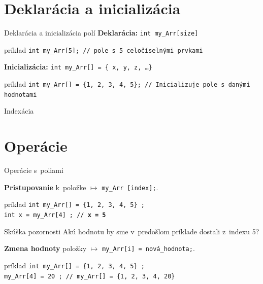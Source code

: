 \documentclass[xcolor=dvipsnames]{beamer}
\begin{document}
\section{Deklarácia a inicializácia}
\begin{frame}{Deklarácia a inicializácia polí}
    \textbf{Deklarácia:} \texttt{int my\_Arr[size]}
    \begin{block}{príklad}
        \texttt{int my\_Arr[5]; // pole s~5 celočíselnými prvkami}
    \end{block}
    
    \textbf{Inicializácia:} \texttt{int my\_Arr[] = \{ x, y, z, \ldots \}}
    \begin{block}{príklad}
        \texttt{int my\_Arr[] = \{1, 2, 3, 4, 5\}; // Inicializuje pole s~danými hodnotami}
    \end{block}
    \begin{alertblock}{Indexácia}
    \end{alertblock}
\end{frame}
\section{Operácie}
\begin{frame}{Operácie s~poliami}

    \textbf{Pristupovanie} k~položke $\longmapsto$ \texttt{my\_Arr [index];}.
    \begin{block}{príklad}
        \texttt{int my\_Arr[] = \{1, 2, 3, 4, 5\} ;\\
        \texttt{int x = my\_Arr[4] ; // \textbf{x = 5}}  
    }
    \end{block}
    \begin{alertblock}{Skúška pozornosti}
        Akú hodnotu by sme v~predošlom príklade dostali z~indexu 5?
    \end{alertblock}
    \textbf{Zmena hodnoty} položky $\longmapsto$ \texttt{my\_Arr[i] = nová\_hodnota;}.
    \begin{block}{príklad}
        \texttt{int my\_Arr[] = \{1, 2, 3, 4, 5\} ;\\
        \texttt{my\_Arr[4] = 20 ; // \texttt{my\_Arr[] = \{1, 2, 3, 4, {\color{red}20}\}}}  
    }
    \end{block}
\end{frame}
\end{document}
